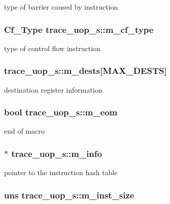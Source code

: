 \label{structtrace__uop__s_adb4072e10f06644f837979021c37b4ed}
type of barrier caused by instruction \hypertarget{structtrace__uop__s_a2914ddcaa6787d93914de16edfd7369a}{
\subsubsection[{m\_\-cf\_\-type}]{\setlength{\rightskip}{0pt plus 5cm}Cf\_\-Type {\bf trace\_\-uop\_\-s::m\_\-cf\_\-type}}}
\label{structtrace__uop__s_a2914ddcaa6787d93914de16edfd7369a}
type of control flow instruction \hypertarget{structtrace__uop__s_acb7781a9850d511660ef11154c4963b9}{
\subsubsection[{m\_\-dests}]{ {\bf trace\_\-uop\_\-s::m\_\-dests}\mbox{[}MAX\_\-DESTS\mbox{]}}}
\label{structtrace__uop__s_acb7781a9850d511660ef11154c4963b9}
destination register information \hypertarget{structtrace__uop__s_aaec1290a2d169f8ff019f586b36efdf1}{
\subsubsection[{m\_\-eom}]{\setlength{\rightskip}{0pt plus 5cm}bool {\bf trace\_\-uop\_\-s::m\_\-eom}}}
\label{structtrace__uop__s_aaec1290a2d169f8ff019f586b36efdf1}
end of macro \hypertarget{structtrace__uop__s_a88c111115b7caed114263b32bfbeef12}{
\subsubsection[{m\_\-info}]{$\ast$ {\bf trace\_\-uop\_\-s::m\_\-info}}}
\label{structtrace__uop__s_a88c111115b7caed114263b32bfbeef12}
pointer to the instruction hash table \hypertarget{structtrace__uop__s_a6a3c82bbf6153fbee7bc8dd1bf4552c7}{
\subsubsection[{m\_\-inst\_\-size}]{\setlength{\rightskip}{0pt plus 5cm}uns {\bf trace\_\-uop\_\-s::m\_\-inst\_\-size}}}
